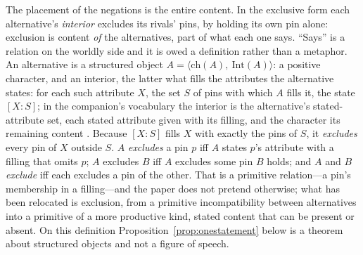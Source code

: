 \documentclass[11pt]{article}
\begin{document}

The placement of the negations is the entire content. In the exclusive form each alternative's \emph{interior} excludes its rivals' pins, by holding its own pin alone: exclusion is content \emph{of} the alternatives, part of what each one says. ``Says'' is a relation on the worldly side and it is owed a definition rather than a metaphor. An alternative is a structured object $A = \langle \mathrm{ch}(A),\ \mathrm{Int}(A) \rangle$: a positive character, and an interior, the latter what fills the attributes the alternative states: for each such attribute $X$, the set $S$ of pins with which $A$ fills it, the state $[X : S]$; in the companion's vocabulary the interior is the alternative's stated-attribute set, each stated attribute given with its filling, and the character its remaining content \parencite{Aethus}. Because $[X : S]$ fills $X$ with exactly the pins of $S$, it \emph{excludes} every pin of $X$ outside $S$. $A$ \emph{excludes} a pin $p$ iff $A$ states $p$'s attribute with a filling that omits $p$; $A$ excludes $B$ iff $A$ excludes some pin $B$ holds; and $A$ and $B$ \emph{exclude} iff each excludes a pin of the other. That is a primitive relation---a pin's membership in a filling---and the paper does not pretend otherwise; what has been relocated is exclusion, from a primitive incompatibility between alternatives into a primitive of a more productive kind, stated content that can be present or absent. On this definition Proposition~\ref{prop:onestatement} below is a theorem about structured objects and not a figure of speech.
\end{document}
